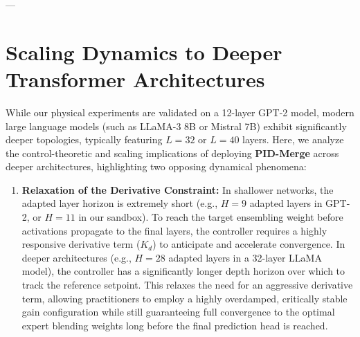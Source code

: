 ---

\section{Scaling Dynamics to Deeper Transformer Architectures}
\label{sec:appendix_scaling}

While our physical experiments are validated on a 12-layer GPT-2 model, modern large language models (such as LLaMA-3 8B or Mistral 7B) exhibit significantly deeper topologies, typically featuring $L = 32$ or $L = 40$ layers. Here, we analyze the control-theoretic and scaling implications of deploying \textbf{PID-Merge} across deeper architectures, highlighting two opposing dynamical phenomena:

\begin{enumerate}
    \item \textbf{Relaxation of the Derivative Constraint:} In shallower networks, the adapted layer horizon is extremely short (e.g., $H = 9$ adapted layers in GPT-2, or $H = 11$ in our sandbox). To reach the target ensembling weight before activations propagate to the final layers, the controller requires a highly responsive derivative term ($K_d$) to anticipate and accelerate convergence. In deeper architectures (e.g., $H = 28$ adapted layers in a 32-layer LLaMA model), the controller has a significantly longer depth horizon over which to track the reference setpoint. This relaxes the need for an aggressive derivative term, allowing practitioners to employ a highly overdamped, critically stable gain configuration while still guaranteeing full convergence to the optimal expert blending weights long before the final prediction head is reached.

\end{enumerate}
